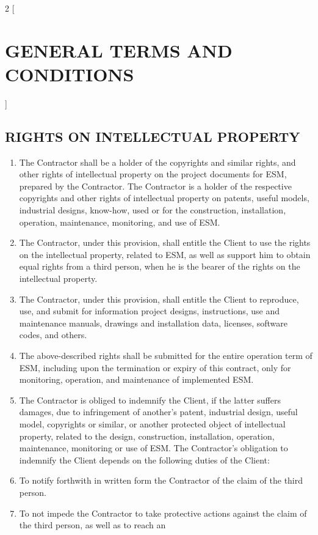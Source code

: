 \begin{multicols}{2} [\section{GENERAL TERMS AND CONDITIONS}]
      \subsection{RIGHTS ON INTELLECTUAL PROPERTY}
      \begin{enumerate}
      \item The Contractor shall be a holder of the copyrights and
        similar rights, and other rights of intellectual property on
        the project documents for ESM, prepared by the Contractor. The
        Contractor is a holder of the respective copyrights and other
        rights of intellectual property on patents, useful models,
        industrial designs, know-how, used or for the construction,
        installation, operation, maintenance, monitoring, and use of
        ESM.
      \item The Contractor, under this provision, shall entitle the
        Client to use the rights on the intellectual property, related
        to ESM, as well as support him to obtain equal rights from a
        third person, when he is the bearer of the rights on the
        intellectual property.
      \item The Contractor, under this provision, shall entitle the
        Client to reproduce, use, and submit for information project
        designs, instructions, use and maintenance manuals, drawings
        and installation data, licenses, software codes, and others.
      \item The above-described rights shall be submitted for the
        entire operation term of ESM, including upon the termination
        or expiry of this contract, only for monitoring, operation,
        and maintenance of implemented ESM.
      \item The Contractor is obliged to indemnify the Client, if the
        latter suffers damages, due to infringement of another’s
        patent, industrial design, useful model, copyrights or
        similar, or another protected object of intellectual property,
        related to the design, construction, installation, operation,
        maintenance, monitoring or use of ESM. The Contractor’s
        obligation to indemnify the Client depends on the following
        duties of the Client:
      \item To notify forthwith in written form the Contractor of the
        claim of the third person.
      \item To not impede the Contractor to take protective actions
        against the claim of the third person, as well as to reach an

\end{enumerate}
\end{multicols}
